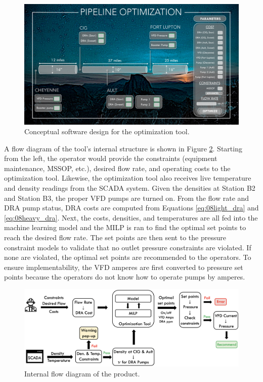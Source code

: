 \begin{figure}[h]
    \centering
    \includegraphics[width=\textwidth]{images/suncor/08conceptual_software.pdf}
    \caption{Conceptual software design for the optimization tool.}
    \label{fig:08concept_software}
\end{figure}

A flow diagram of the tool's internal structure is shown in Figure \ref{fig:08Product_Flow}. Starting from the left, the operator would provide the constraints (equipment maintenance, MSSOP, etc.), desired flow rate, and operating costs to the optimization tool.  Likewise, the optimization tool also receives live temperature and density readings from the SCADA system.  Given the densities at Station B2 and Station B3, the proper VFD pumps are turned on.  From the flow rate and DRA pump status, DRA costs are computed from Equations \ref{eq:08light_dra} and \ref{eq:08heavy_dra}.  Next, the costs, densities, and temperatures are all fed into the machine learning model and the MILP is ran to find the optimal set points to reach the desired flow rate. The set points are then sent to the pressure constraint models to validate that no outlet pressure constraints are violated.  If none are violated, the optimal set points are recommended to the operators. To ensure implementability, the VFD amperes are first converted to pressure set points because the operators do not know how to operate pumps by amperes.

\begin{figure}[h]
    \centering
    \includegraphics[width=\textwidth]{images/suncor/08Product_Flow.png}
    \caption{Internal flow diagram of the product.}
    \label{fig:08Product_Flow}
\end{figure}

